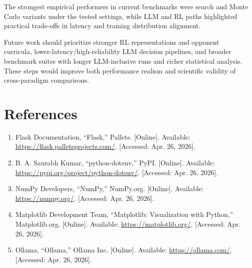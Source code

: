 \documentclass[11pt]{article}
\begin{document}
The strongest empirical performers in current benchmarks were search and Monte Carlo variants under the tested settings, while LLM and RL paths highlighted practical trade-offs in latency and training distribution alignment.

Future work should prioritize stronger RL representations and opponent curricula, lower-latency/high-reliability LLM decision pipelines, and broader benchmark suites with longer LLM-inclusive runs and richer statistical analysis. These steps would improve both performance realism and scientific validity of cross-paradigm comparisons.

\section{References}
\begin{enumerate}[leftmargin=*]
  \item Flask Documentation, ``Flask,'' Pallets. [Online]. Available: \url{https://flask.palletsprojects.com/}. [Accessed: Apr. 26, 2026].
  \item B. A. Saurabh Kumar, ``python-dotenv,'' PyPI. [Online]. Available: \url{https://pypi.org/project/python-dotenv/}. [Accessed: Apr. 26, 2026].
  \item NumPy Developers, ``NumPy,'' NumPy.org. [Online]. Available: \url{https://numpy.org/}. [Accessed: Apr. 26, 2026].
  \item Matplotlib Development Team, ``Matplotlib: Visualization with Python,'' Matplotlib.org. [Online]. Available: \url{https://matplotlib.org/}. [Accessed: Apr. 26, 2026].
  \item Ollama, ``Ollama,'' Ollama Inc. [Online]. Available: \url{https://ollama.com/}. [Accessed: Apr. 26, 2026].
\end{enumerate}
\end{document}
